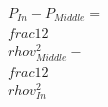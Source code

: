 \documentclass[preview]{standalone}
\begin{document}
\begin{align*}
P_{In} - P_{Middle}  = \\frac{1}{2} \\rho v_{Middle}^2 - \\frac{1}{2} \\rho v_{In}^2
\end{align*}
\end{document}
